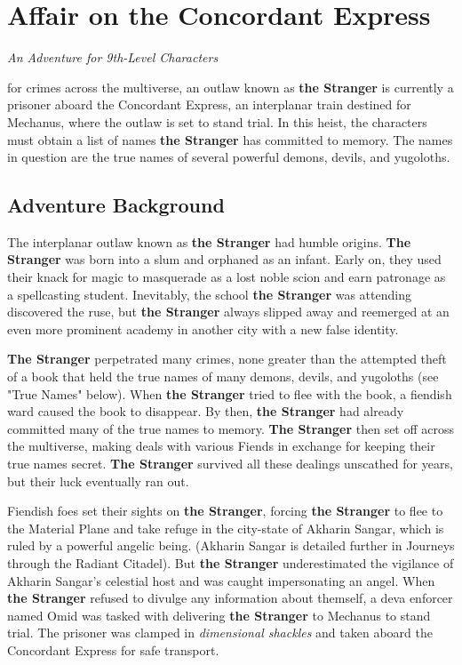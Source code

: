 \documentclass[10pt,a4paper,twoside,bg=print,twocolumn,openany,nodeprecatedcode]{dndbook}
\date{}
\begin{document}
\mainmatter

\chapter*{Affair on the Concordant Express}
\textit{An Adventure for 9th-Level Characters}

 for crimes across the multiverse, an outlaw known as \textbf{the Stranger} is currently a prisoner aboard the Concordant Express, an interplanar train destined for Mechanus, where the outlaw is set to stand trial. In this heist, the characters must obtain a list of names \textbf{the Stranger} has committed to memory. The names in question are the true names of several powerful demons, devils, and yugoloths.


\section{Adventure Background}
The interplanar outlaw known as \textbf{the Stranger} had humble origins. \textbf{The Stranger} was born into a slum and orphaned as an infant. Early on, they used their knack for magic to masquerade as a lost noble scion and earn patronage as a spellcasting student. Inevitably, the school \textbf{the Stranger} was attending discovered the ruse, but \textbf{the Stranger} always slipped away and reemerged at an even more prominent academy in another city with a new false identity.

\textbf{The Stranger} perpetrated many crimes, none greater than the attempted theft of a book that held the true names of many demons, devils, and yugoloths (see "True Names" below). When \textbf{the Stranger} tried to flee with the book, a fiendish ward caused the book to disappear. By then, \textbf{the Stranger} had already committed many of the true names to memory. \textbf{The Stranger} then set off across the multiverse, making deals with various Fiends in exchange for keeping their true names secret. \textbf{The Stranger} survived all these dealings unscathed for years, but their luck eventually ran out.

Fiendish foes set their sights on \textbf{the Stranger}, forcing \textbf{the Stranger} to flee to the Material Plane and take refuge in the city-state of Akharin Sangar, which is ruled by a powerful angelic being. (Akharin Sangar is detailed further in Journeys through the Radiant Citadel). But \textbf{the Stranger} underestimated the vigilance of Akharin Sangar's celestial host and was caught impersonating an angel. When \textbf{the Stranger} refused to divulge any information about themself, a deva enforcer named Omid was tasked with delivering \textbf{the Stranger} to Mechanus to stand trial. The prisoner was clamped in \textit{dimensional shackles} and taken aboard the Concordant Express for safe transport.
\end{document}
